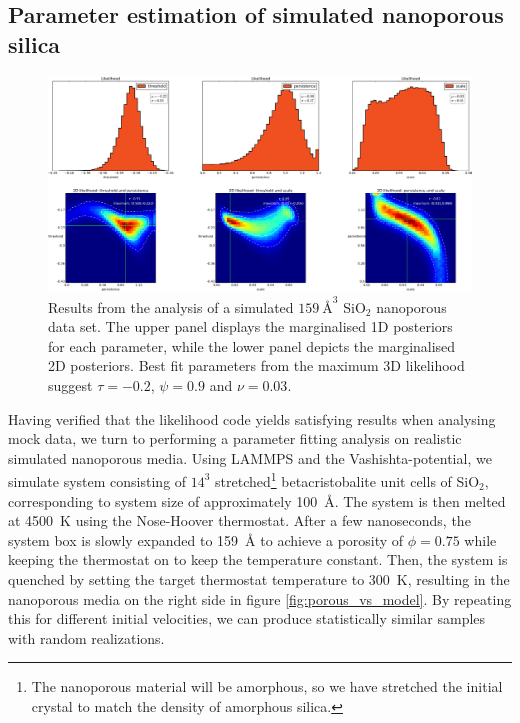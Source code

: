 \documentclass[aps,pre,twocolumn,letterpaper,floatfix,showpacs]{revtex4}
\begin{document}
\subsection{Parameter estimation of simulated nanoporous silica}
\begin{figure}
\includegraphics[width=.99\textwidth]{results_porous_full.png}
\caption{
Results from the analysis of a simulated $\SI{159} {\angstrom}^3$ SiO$_2$ nanoporous data set. The upper panel displays the marginalised 1D posteriors for each parameter, while the lower panel depicts the marginalised 2D posteriors. Best fit parameters from the maximum 3D likelihood suggest $\tau=-0.2$, $\psi=0.9$ and $\nu=0.03$.
}

\label{fig:porous_results1}
\end{figure}
Having verified that the likelihood code yields satisfying results when analysing mock data, we turn to 
performing a parameter fitting analysis on realistic simulated nanoporous media.
Using LAMMPS\cite{plimpton1995fast} and the Vashishta-potential\cite{vashishta1990interaction},
we simulate system consisting of $14^3$ stretched\footnote{The nanoporous material will be amorphous, so we have stretched the initial crystal to match the density of amorphous silica.} betacristobalite unit cells of SiO$_2$, corresponding
to system size of approximately \SI{100}{\angstrom}. 
The system is then melted at \SI{4500}{\kelvin} using the Nose-Hoover thermostat.
After a few nanoseconds, the system box is slowly expanded to \SI{159}{\angstrom} to achieve a porosity of $\phi=0.75$ while keeping the thermostat on to keep the temperature constant.
Then, the system is quenched by setting the target thermostat temperature to \SI{300}{\kelvin},
resulting in the nanoporous media on the right side in figure \ref{fig:porous_vs_model}. 
By repeating this for different initial velocities, we can produce statistically similar samples with random realizations. 
\end{document}
